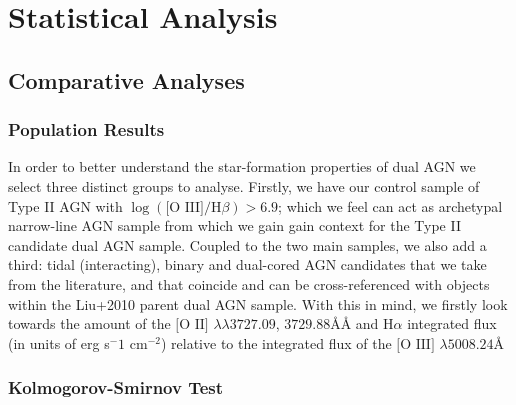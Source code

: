 \section{Statistical Analysis}
\subsection{Comparative Analyses}
\subsubsection{Population Results}

In order to better understand the star-formation properties of dual AGN we select three distinct groups to analyse. Firstly, we have our control sample of Type II AGN with $\log{(\text{[O III]}/\text{H}\beta)}>{6.9}$; which we feel can act as archetypal narrow-line AGN sample from which we gain gain context for the Type II candidate dual AGN sample. Coupled to the two main samples, we also add a third: tidal (interacting), binary and dual-cored AGN candidates that we take from the literature, and that coincide and can be cross-referenced with objects within the Liu+2010 parent dual AGN sample. With this in mind, we firstly look towards the amount of the $\text{[O II]}$ $\lambda\lambda$$3727.09$, $3729.88$\AA\AA{} and $\text{H}\alpha$ integrated flux (in units of erg s${^-1}$ cm$^{-2}$) relative to the integrated flux of the $\text{[O III]}$ $\lambda$$5008.24$\AA{}   

\subsubsection{Kolmogorov-Smirnov Test}


  
  